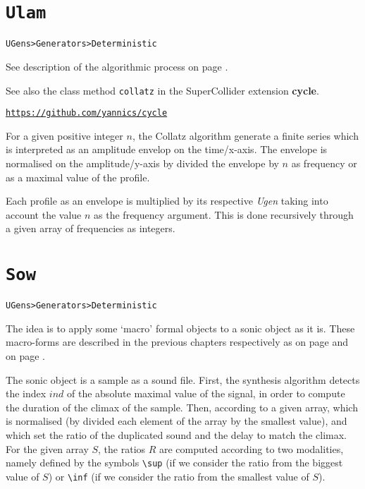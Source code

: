 \section{\texttt{Ulam}}
\label{colz}

\texttt{UGens>Generators>Deterministic}

\bigskip

See description of the algorithmic process on page \pageref{colres}. 

See also the class method \texttt{collatz} in the SuperCollider extension \textbf{cycle}. %

\href{https://github.com/yannics/cl-mst}{\texttt{\small https://github.com/yannics/cycle}}

\bigskip
For a given positive integer $n$, the Collatz algorithm generate a finite series which is interpreted as an amplitude envelop on the time/x-axis. The envelope is normalised on the amplitude/y-axis by divided the envelope by $n$ as frequency or as a maximal value of the profile. 

\bigskip

Each profile as an envelope is multiplied by its respective \textit{Ugen} taking into account the value $n$ as the frequency argument. This is done recursively through a given array of frequencies as integers.


\section{\texttt{Sow}}
\label{cfso}

\texttt{UGens>Generators>Deterministic}

\bigskip

The idea is to apply some `macro' formal objects to a sonic object as it is. These macro-forms are described in the previous chapters respectively as  on page \pageref{imp2} and  on page \pageref{imp3}.

\bigskip
The sonic object is a sample as a sound file. First, the synthesis algorithm detects the index $ind$ of the absolute maximal value of the signal, in order to compute the duration of the climax of the sample. Then, according to a given array, which is normalised (by divided each element of the array by the smallest value), and which set the ratio of the duplicated sound and the delay to match the climax. For the given array $S$, the ratios $R$ are computed according to two modalities, namely defined by the symbols \texttt{\textbackslash sup} (if we consider the ratio from the biggest value of $S$) or \texttt{\textbackslash inf} (if we consider the ratio from the smallest value of $S$).

